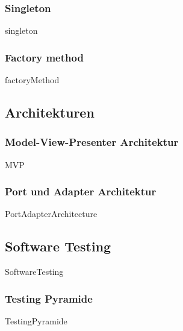 \documentclass{article}
\begin{document}
        \subsubsection{Singleton}
        \label{kap:gof:singleton}
            {singleton}

        \subsubsection{Factory method}
        \label{kap:gof:factory}
            {factoryMethod}
            

    \newpage
    \subsection{Architekturen}
        \subsubsection{Model-View-Presenter Architektur}
        \label{kap:MVP}
            {MVP}
        
        \newpage
        \subsubsection{Port und Adapter Architektur}
        \label{kap:PortAdapterArchitecture}
            {PortAdapterArchitecture}


    \newpage
    \subsection{Software Testing}
        \nocite{Testing}
        {SoftwareTesting}

        \subsubsection{Testing Pyramide}
            {TestingPyramide}
        
\end{document}
